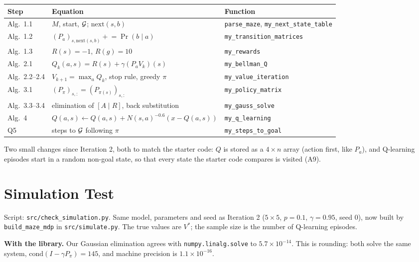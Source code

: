 \begin{center}
\small
\begin{tabular}{>{\raggedright\arraybackslash}p{}>{\raggedright\arraybackslash}p{}>{\raggedright\arraybackslash}p{}}
\toprule
Step & Equation & Function\\
\midrule
Alg.~1.1 & $M$, start, $\mathcal{G}$; $\mathrm{next}(s,b)$ & \texttt{parse\_maze}, \texttt{my\_next\_state\_table}\\
Alg.~1.2 & $(P_a)_{s,\mathrm{next}(s,b)} \mathrel{+}= \Pr(b\mid a)$ & \texttt{my\_transition\_matrices}\\
Alg.~1.3 & $R(s) = -1$, $R(g) = 10$ & \texttt{my\_rewards}\\
Alg.~2.1 & $Q_k(a,s) = R(s)+\gamma(P_aV_k)(s)$ & \texttt{my\_bellman\_Q}\\
Alg.~2.2--2.4 & $V_{k+1} = \max_aQ_k$, stop rule, greedy $\pi$ & \texttt{my\_value\_iteration}\\
Alg.~3.1 & $(P_\pi)_{s,:} = (P_{\pi(s)})_{s,:}$ & \texttt{my\_policy\_matrix}\\
Alg.~3.3--3.4 & elimination of $[A\mid R]$, back substitution & \texttt{my\_gauss\_solve}\\
Alg.~4 & $Q(a,s)\leftarrow Q(a,s)+N(s,a)^{-0.6}(x-Q(a,s))$ & \texttt{my\_q\_learning}\\
Q5 & steps to $\mathcal{G}$ following $\pi$ & \texttt{my\_steps\_to\_goal}\\
\bottomrule
\end{tabular}
\end{center}

\noindent Two small changes since Iteration 2, both to match the starter code: $Q$ is stored as a $4\times n$ array (action first, like $P_a$), and Q-learning episodes start in a random non-goal state, so that every state the starter code compares is visited (A9).

\section{Simulation Test}

Script: \texttt{src/check\_simulation.py}. Same model, parameters and seed as Iteration 2 ($5\times5$, $p = 0.1$, $\gamma = 0.95$, seed 0), now built by \texttt{build\_maze\_mdp} in \texttt{src/simulate.py}. The true values are $V^*$; the sample size is the number of Q-learning episodes.

\noindent\textbf{With the library.} Our Gaussian elimination agrees with \texttt{numpy.linalg.solve} to $5.7\times10^{-14}$. This is rounding: both solve the same system, $\mathrm{cond}(I-\gamma P_\pi) = 145$, and machine precision is $1.1\times10^{-16}$.

